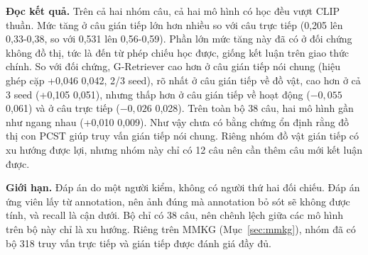 \begin{table}[t]
\centering
\caption{\mrr{} trên bộ 38 truy vấn KG (test Visual Genome), mean \pmm{} std qua 3 seed; CLIP thuần tất định. Đối chứng: không đồ thị, cùng cấu hình huấn luyện (lr $10^{-4}$)}
\label{tab:kgbench-res}
\scriptsize
\setlength{\tabcolsep}{2pt}
\end{table}

\textbf{Đọc kết quả.} Trên cả hai nhóm câu, cả hai mô hình có học đều vượt CLIP thuần. Mức tăng ở câu gián tiếp lớn hơn nhiều so với câu trực tiếp (0,205 lên 0,33-0,38, so với 0,531 lên 0,56-0,59). Phần lớn mức tăng này đã có ở đối chứng không đồ thị, tức là đến từ phép chiếu học được, giống kết luận trên giao thức chính. So với đối chứng, G-Retriever cao hơn ở câu gián tiếp nói chung (hiệu ghép cặp +0,046 \pmm{} 0,042, 2/3 seed), rõ nhất ở câu gián tiếp về đồ vật, cao hơn ở cả 3 seed (+0,105 \pmm{} 0,051), nhưng thấp hơn ở câu gián tiếp về hoạt động ($-0,055$ \pmm{} 0,061) và ở câu trực tiếp ($-0,026$ \pmm{} 0,028). Trên toàn bộ 38 câu, hai mô hình gần như ngang nhau (+0,010 \pmm{} 0,009). Như vậy chưa có bằng chứng ổn định rằng đồ thị con PCST giúp truy vấn gián tiếp nói chung. Riêng nhóm đồ vật gián tiếp có xu hướng được lợi, nhưng nhóm này chỉ có 12 câu nên cần thêm câu mới kết luận được.

\textbf{Giới hạn.} Đáp án do một người kiểm, không có người thứ hai đối chiếu. Đáp án ứng viên lấy từ annotation, nên ảnh đúng mà annotation bỏ sót sẽ không được tính, và recall là cận dưới. Bộ chỉ có 38 câu, nên chênh lệch giữa các mô hình trên bộ này chỉ là xu hướng. Riêng trên MMKG (Mục~\ref{sec:mmkg}), nhóm đã có bộ 318 truy vấn trực tiếp và gián tiếp được đánh giá đầy đủ.
